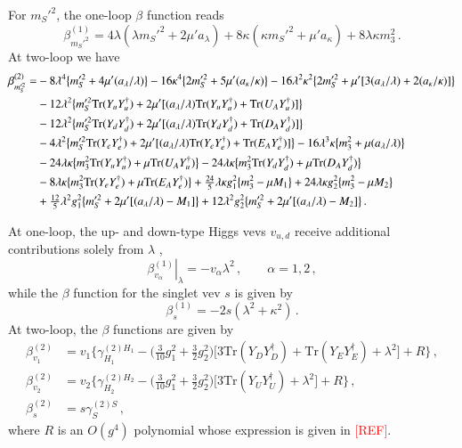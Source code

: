 \documentclass[final,3p,times,pdflatex]{elsarticle}
\newcommand{\be}{\begin{equation}}
\newcommand{\ee}{\end{equation}}
\newcommand{\lamsq}{\lambda^2}
\newcommand{\kapsq}{\kappa^2}
\newcommand{\tr}{\mathrm{Tr}}
\newcommand{\mtrisq}{m_3^2}
\newcommand{\msprsq}{m_S'^2}
\newcommand{\Alam}{a_\lambda/\lambda}
\newcommand*{\red}[1]{\textcolor{red}{#1}}
\begin{document}
For $\msprsq$, the one-loop $\beta$ function reads
%
\begin{equation}
\beta_{\msprsq}^{(1)} = 4\lambda(\lambda\msprsq + 2\mu' a_\lambda) + 8\kappa(\kappa\msprsq + \mu' a_\kappa) + 8\lambda\kappa\mtrisq \,.
\end{equation}
%
%
At two-loop we have
\begin{align}
\beta_{\msprsq}^{(2)} =& -8\lambda^4\big\{\msprsq + 4\mu'(a_\lambda/\lambda)\big\} - 16\kappa^4\big\{ 2\msprsq + 5\mu'(a_\kappa/\kappa) \big\} 
- 16\lamsq\kapsq\big\{ 2\msprsq + \mu'[3(a_\lambda/\lambda) + 2(a_\kappa/\kappa)] \big\} \notag \\
%
&-12\lamsq\big\{ \msprsq\tr( Y_u Y_u^\dagger) + 2\mu'[(\Alam)\tr( Y_u Y_u^\dagger) + \tr( U_A Y_u^\dagger)] \big\} \notag \\
%
&-12\lamsq\big\{\msprsq\tr( Y_d Y_d^\dagger) + 2\mu'[(\Alam)\tr( Y_d Y_d^\dagger) + \tr( D_A Y_d^\dagger)] \big\} \notag \\
%
&-4\lamsq\big\{\msprsq\tr( Y_e Y_e^\dagger) + 2\mu'[(\Alam)\tr( Y_e Y_e^\dagger) + \tr( E_A Y_e^\dagger)] \big\} 
-16\lambda^3\kappa\big\{ \mtrisq + \mu(\Alam)\big \} \notag \\
%
&-24\lambda\kappa\big\{ \mtrisq\tr( Y_u Y_u^\dagger) + \mu\tr( U_A Y_u^\dagger)\big\} 
-24\lambda\kappa\big\{ \mtrisq\tr( Y_d Y_d^\dagger) + \mu\tr( D_A Y_d^\dagger)\big\} \notag \\
%
&-8\lambda\kappa\big\{ \mtrisq\tr( Y_e Y_e^\dagger) + \mu\tr( E_A Y_e^\dagger)\big\} 
+\tfrac{24}{5}\lambda\kappa g_1^2\big\{\mtrisq - \mu M_1\big\} + 24\lambda\kappa g_2^2\big\{\mtrisq - \mu M_2 \big\} \notag \\
%
&+\tfrac{12}{5}\lamsq g_1^2\big\{\msprsq + 2\mu'[(\Alam) - M_1]\big\} 
+12\lamsq g_2^2 \big\{\msprsq + 2\mu'[(\Alam) - M_2] \big\}\,.
\end{align}

At one-loop, the up- and down-type Higgs vevs $v_{u,d}$ receive additional contributions solely from $\lambda$ \cite{Sper13},
%
\be
\left.\beta^{(1)}_{v_\alpha}\right|_\lambda = -v_\alpha\lamsq\,, \qquad \alpha=1,2\,,
\ee
%
while the $\beta$ function for the singlet vev $s$ is given by
%
\be 
\beta^{(1)}_s = -2s(\lamsq + \kapsq)\,.
\ee
%
At two-loop, the $\beta$ functions are given by \cite{Sper13}
%
\begin{align}
\beta^{(2)}_{v_1} &= v_1\Bigg\{\gamma^{(2)H_1}_{H_1} - \Big(\tfrac{3}{10}g_1^2 + \tfrac{3}{2}g_2^2\Big)\Big[3\tr(Y_DY_D^\dagger) + \tr(Y_EY_E^\dagger) + \lamsq\Big] + R\Bigg\}\,, \\
%
\beta^{(2)}_{v_2} &= v_2\Bigg\{\gamma^{(2)H_2}_{H_2} - 
\Big(\tfrac{3}{10}g_1^2 + \tfrac{3}{2}g_2^2\Big)
\Big[3\tr(Y_UY_U^\dagger) + \lamsq\Big] + R\Bigg\}\,, \\
%
\beta^{(2)}_s &= s\gamma^{(2)S}_S\,,
\end{align}
%
where $R$ is an $O(g^4)$ polynomial whose expression is given in \red{[REF]}.
\end{document}
